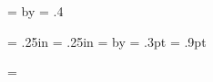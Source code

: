 {{\newskip\bigtab \newskip\smalltab
\newskip\edgetabdepth
\newbox\tabbox

\bigtab = \totalheight    \divide\bigtab by \numtabs
\smalltab = .4\bigtab %

\newdimen\edgetabin     \edgetabin = .25in
\newdimen\edgetabbleed  \edgetabbleed = .25in
\newdimen\edgetabwidth
   \edgetabwidth = \edgetabin
   \advance \edgetabwidth by \edgetabbleed
\newdimen\edgethick   \edgethick = .3pt %
\newdimen\edgespacing \edgespacing = .9pt %


\def\edgetabs{\vbox to 0pt{%
   \vskip-\headmargin
   \vskip\edgetabjump
   \hbox{%
      \hskip \hsize
      \hskip\outsidemargin
      \hskip-\edgetabin
      \copy\tabbox
      }%
   \vss
}}


%
\def\pagecontents{%
   \unvbox255   %
   \ifvoid\footins\else   %
      \vskip\skip\footins
      \footnoterule
      \unvbox\footins
   \fi
}


%
%
\def\minref#1{%
   #1%
}

%
\def\minrefs#1{%
   \ignorespaces
}

%
\def\minrefsdelim#1\endmark{\minrefs{#1}}

%
\let\@plainfootnote = \footnote
\let\footnote = \numberedfootnote
\everyfootnote = {\footnotefonts}


%
\def\margin#1{%
   \ifhmode
      \vadjust{\printmarginnote{#1}}%
   \else
      \dimen0 = \prevdepth
      \prevdepth = -1000pt
      \printmarginnote{#1}%
      \prevdepth = \dimen0
   \fi
   \ignorespaces
}

\def\printmarginnote#1{%
   \hbox to 0pt{%
      \hskip 1.1\hsize
      \vbox to 0pt{%
    \everypar = {}%
    \hsize = 1in \rightskip = 0pt plus 1fil \noindent \sevenrm
    \let\tt = \eighttt
    \parfillskip = 0pt plus 1fil
    \baselineskip = 8pt #1%
         \vss
      }%
      \hss
   }%
}

}}
